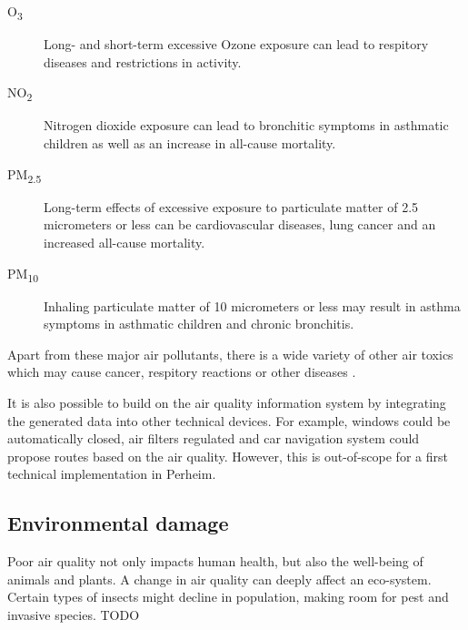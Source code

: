 \documentclass[conference]{IEEEtran}
\begin{document}
\begin{description} 
\item[O\textsubscript{3}] Long- and short-term excessive Ozone exposure can lead to respitory diseases and restrictions in activity.
\item[NO\textsubscript{2}] Nitrogen dioxide exposure can lead to bronchitic symptoms in asthmatic children as well as an increase in all-cause mortality.
\item[PM\textsubscript{2.5}] Long-term effects of excessive exposure to particulate matter of 2.5 micrometers or less can be cardiovascular diseases, lung cancer and an increased all-cause mortality.
\item[PM\textsubscript{10}] Inhaling particulate matter of 10 micrometers or less may result in asthma symptoms in asthmatic children and chronic bronchitis.
\end{description} 

Apart from these major air pollutants, there is a wide variety of other air toxics which may cause cancer, respitory reactions or other diseases \cite{UnitedStatesEnvironmentalProtectionAgency}.

It is also possible to  build on the air quality information system by integrating the generated data into other technical devices. For example, windows could be automatically closed, air filters regulated and car navigation system could propose routes based on the air quality. However, this is out-of-scope for a first technical implementation in Perheim.

\subsection{Environmental damage}
Poor air quality not only impacts human health, but also the well-being of animals and plants. A change in air quality can deeply affect an eco-system. Certain types of insects might decline in population, making room for pest and invasive species. TODO
\end{document}
